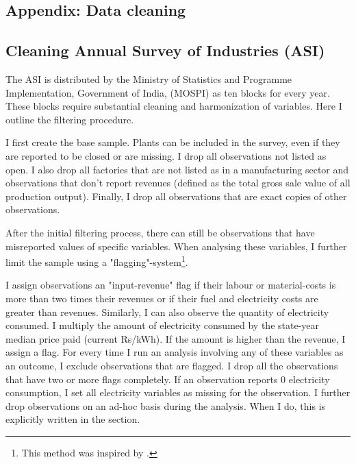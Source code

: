 \documentclass[11pt]{article}
\begin{document}


\begin{appendices}

\newpage

\section{Appendix: Data cleaning}%
\label{sec:appendix_data_cleaning}

\subsection{Cleaning Annual Survey of Industries (ASI)}%
\label{sub:cleaning_annual_survey_of_industries_asi}

The ASI is distributed by the Ministry of Statistics and Programme Implementation, Government of India, (MOSPI) as ten blocks for every year. These blocks require substantial cleaning and harmonization of variables. Here I outline the filtering procedure.

I first create the base sample. Plants can be included in the survey, even if they are reported to be closed or are missing. I drop all observations not listed as open. I also drop all factories that are not listed as in a manufacturing sector and observations that don't report revenues (defined as the total gross sale value of all production output). Finally, I drop all observations that are exact copies of other observations.

After the initial filtering process, there can still be observations that have misreported values of specific variables. When analysing these variables, I further limit the sample using a "flagging"-system\footnote{This method was inspired by \cite{allcott_how_2016}.}. 

I assign observations an "input-revenue" flag if their labour or material-costs is more than two times their revenues or if their fuel and electricity costs are greater than revenues. Similarly, I can also observe the quantity of electricity consumed. I multiply the amount of electricity consumed by the state-year median price paid (current Rs/kWh). If the amount is higher than the revenue, I assign a flag. For every time I run an analysis involving any of these variables as an outcome, I exclude observations that are flagged. I drop all the observations that have two or more flags completely. If an observation reports 0 electricity consumption, I set all electricity variables as missing for the observation. I further drop observations on an ad-hoc basis during the analysis. When I do, this is explicitly written in the section.


\end{appendices}
\end{document}
